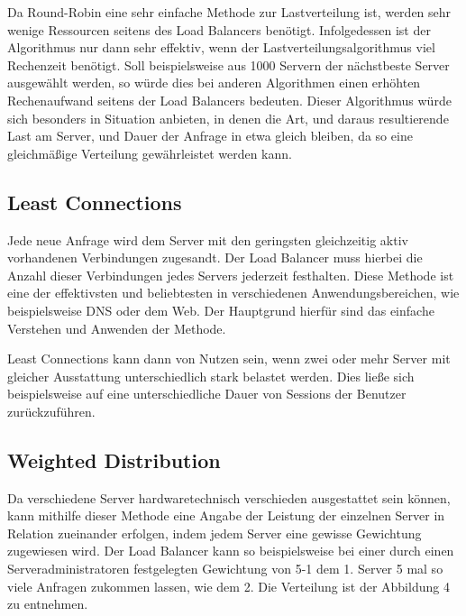 Da Round-Robin eine sehr einfache Methode zur Lastverteilung ist, werden sehr wenige Ressourcen seitens des Load Balancers benötigt. Infolgedessen ist der Algorithmus nur dann sehr effektiv, wenn der Lastverteilungsalgorithmus viel Rechenzeit benötigt.
Soll beispielsweise aus 1000 Servern der nächstbeste Server ausgewählt werden, so würde dies bei anderen Algorithmen einen erhöhten Rechenaufwand seitens der Load Balancers bedeuten. Dieser Algorithmus würde sich besonders in Situation anbieten, in denen die Art, und daraus resultierende Last am Server, und Dauer der Anfrage in etwa gleich bleiben, da so eine gleichmäßige Verteilung gewährleistet werden kann. \cite{LoadBalancing2}

\subsection{Least Connections}
\label{sec:Least Connections}
Jede neue Anfrage wird dem Server mit den geringsten gleichzeitig aktiv vorhandenen Verbindungen zugesandt. Der Load Balancer muss hierbei die Anzahl dieser Verbindungen jedes Servers jederzeit festhalten. Diese Methode ist eine der effektivsten und beliebtesten in verschiedenen Anwendungsbereichen, wie beispielsweise DNS oder dem Web. Der Hauptgrund hierfür sind das einfache Verstehen und Anwenden der Methode. \cite{LoadBalancing2}

Least Connections kann dann von Nutzen sein, wenn zwei oder mehr Server mit gleicher Ausstattung unterschiedlich stark belastet werden. Dies ließe sich beispielsweise auf eine unterschiedliche Dauer von Sessions der Benutzer zurückzuführen.
\cite{WeightedLoadBalancingGrafik}

\subsection{Weighted Distribution}
\label{sec:Weighted Distribution}
Da verschiedene Server hardwaretechnisch verschieden ausgestattet sein können, kann mithilfe dieser Methode eine Angabe der Leistung der einzelnen Server in Relation zueinander erfolgen, indem jedem Server eine gewisse Gewichtung zugewiesen wird. Der Load Balancer kann so beispielsweise bei einer durch einen Serveradministratoren festgelegten Gewichtung von 5-1 dem 1. Server 5 mal so viele Anfragen zukommen lassen, wie dem 2. Die Verteilung ist der Abbildung 4 zu entnehmen.

